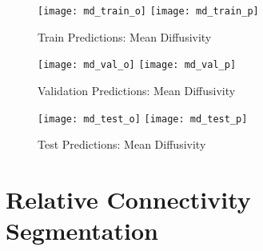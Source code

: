\begin{figure}[H]
\centering
\texttt{[image: md\_train\_o]}
\texttt{[image: md\_train\_p]}
\caption{Train Predictions: Mean Diffusivity}
\label{fig:pred-tra-md}
\end{figure}

\begin{figure}[H]
\centering
\texttt{[image: md\_val\_o]}
\texttt{[image: md\_val\_p]}
\caption{Validation Predictions: Mean Diffusivity}
\label{fig:pred-val-md}
\end{figure}

\begin{figure}[H]
\centering
\texttt{[image: md\_test\_o]}
\texttt{[image: md\_test\_p]}
\caption{Test Predictions: Mean Diffusivity}
\label{fig:pred-tes-md}
\end{figure}

\section{Relative Connectivity Segmentation}

